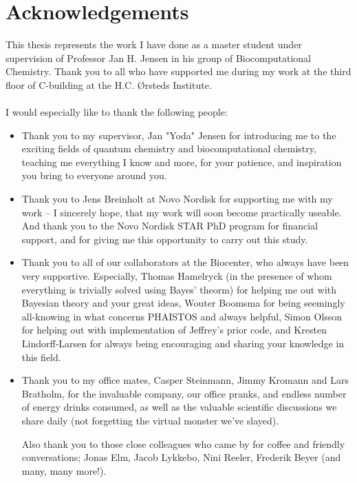 \chapter*{Acknowledgements}

This thesis represents the work I have done as a master student under supervision of Professor Jan H. Jensen in his group of Biocomputational Chemistry.
Thank you to all who have supported me during my work at the third floor of C-building at the H.C. Ørsteds Institute.
\\\\I would especially like to thank the following people:

\begin{itemize}
\item Thank you to my supervisor, Jan "Yoda" Jensen for introducing me to the
    exciting fields of quantum chemistry and biocomputational chemistry, teaching me everything I know and more, for your patience, and inspiration you bring to everyone around you.

\item Thank you to Jens Breinholt at Novo Nordisk for supporting me with my work -- I sincerely hope, that my work will soon become practically useable. And thank you to the Novo Nordisk STAR PhD program for financial support, and for giving me this opportunity to carry out this study.

\item Thank you to all of our collaborators at the Biocenter, who always have been very supportive. Especially, Thomas Hamelryck (in the presence of whom everything is trivially solved using Bayes' theorm) for helping me out with Bayesian theory and your great ideas,  Wouter Boomsma for being seemingly all-knowing in what concerns PHAISTOS and always helpful, Simon Olsson for helping out with implementation of Jeffrey's prior code, and Kresten Lindorff-Larsen for always being encouraging and sharing your knowledge in this field.

\item Thank you to my office mates, Casper Steinmann, Jimmy Kromann and Lars Bratholm, for the invaluable company, our office pranks, and endless number of energy drinks consumed, as well as the valuable scientific discussions we share daily (not forgetting the virtual monster we've slayed).

Also thank you to those close colleagues who came by for coffee and friendly conversations; Jonas Elm, Jacob Lykkebo, Nini Reeler, Frederik Beyer (and many, many more!).


\end{itemize}
